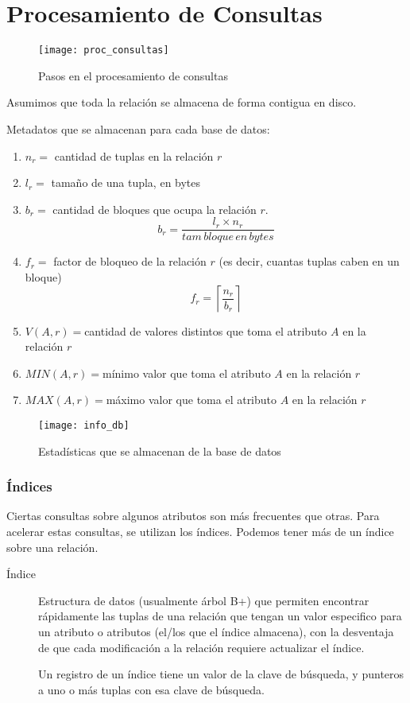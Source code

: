 \documentclass[a4paper, twoside]{article}
\begin{document}
\newpage
\part{Procesamiento de Consultas}
\begin{figure}[H]
	\centering
	\texttt{[image: proc\_consultas]}
	\caption{Pasos en el procesamiento de consultas}
\end{figure}

Asumimos que toda la relación se almacena de forma contigua en disco.

Metadatos que se almacenan para cada base de datos:
\begin{enumerate}
	\item $n_{r}=$ cantidad de tuplas en la relación $r$
	\item $l_{r}=$ tamaño de una tupla, en bytes
	\item $b_{r}=$ cantidad de bloques que ocupa la relación $r$. 
	\[
		b_{r}=\frac{l_{r}\times n_{r}}{tam\, bloque\, en\, bytes}
	\]
	\item $f_{r}=$ factor de bloqueo de la relación $r$ (es decir, cuantas tuplas caben en un bloque)
	\[
		f_{r}=\left\lceil \frac{n_{r}}{b_{r}}\right\rceil 
	\]
	\item $V(A,r)=$cantidad de valores distintos que toma el atributo $A$ en la relación $r$
	\item $MIN(A,r)=$mínimo valor que toma el atributo $A$ en la relación $r$
	\item $MAX(A,r)=$máximo valor que toma el atributo $A$ en la relación $r$
\end{enumerate}

\begin{figure}[H]
	\centering
	\texttt{[image: info\_db]}
	\caption{Estadísticas que se almacenan de la base de datos}
\end{figure}

\section{Índices}
Ciertas consultas sobre algunos atributos son más frecuentes que otras. Para acelerar estas consultas, se utilizan los índices. Podemos tener más de un índice sobre una relación.

\begin{description}
\item[Índice] Estructura de datos (usualmente árbol B+) que permiten encontrar rápidamente las tuplas de una relación que tengan un valor especifico para un atributo o atributos (el/los que el índice almacena), con la desventaja de que cada modificación a la relación requiere actualizar el índice.

Un registro de un índice tiene un valor de la clave de búsqueda, y punteros a uno o más tuplas con esa clave de búsqueda.
\end{description}
\end{document}

